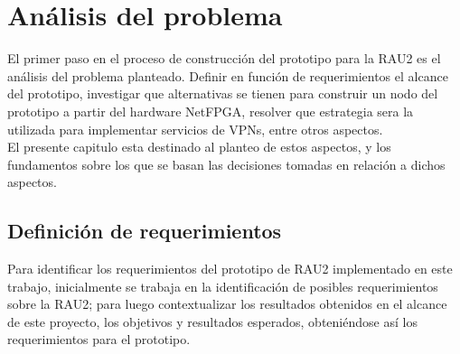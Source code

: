\chapter{An\'alisis del problema}

\ifpdf
    \graphicspath{{Chapter3/Figs/Raster/}{Chapter3/Figs/PDF/}{Chapter3/Figs/}}
\else
    \graphicspath{{Chapter3/Figs/Vector/}{Chapter3/Figs/}}
\fi

El primer paso en el proceso de construcción del prototipo para la RAU2 es el análisis del problema planteado. Definir en función de requerimientos el alcance del prototipo, investigar que alternativas se tienen para construir un nodo del prototipo a partir del hardware NetFPGA, resolver que estrategia sera la utilizada para implementar servicios de VPNs, entre otros aspectos.\\

El presente capitulo esta destinado al planteo de estos aspectos, y los fundamentos sobre los que se basan las decisiones tomadas en relación a dichos aspectos. 




\section[Definición de requerimientos]{Definición de requerimientos}
\label{3.1}

Para identificar los requerimientos del prototipo de RAU2 implementado en este trabajo, inicialmente se trabaja en la identificación de posibles requerimientos sobre la RAU2; para luego contextualizar los resultados obtenidos en el alcance de este proyecto, los objetivos y resultados esperados, obteniéndose  así los requerimientos para el prototipo.\\

